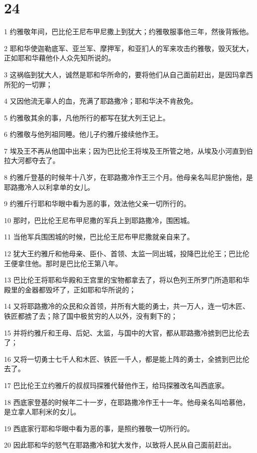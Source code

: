 \chapter{24}

\par 1 约雅敬年间，巴比伦王尼布甲尼撒上到犹大；约雅敬服事他三年，然後背叛他。
\par 2 耶和华使迦勒底军、亚兰军、摩押军，和亚扪人的军来攻击约雅敬，毁灭犹大，正如耶和华藉他仆人众先知所说的。
\par 3 这祸临到犹大人，诚然是耶和华所命的，要将他们从自己面前赶出，是因玛拿西所犯的一切罪；
\par 4 又因他流无辜人的血，充满了耶路撒冷；耶和华决不肯赦免。
\par 5 约雅敬其余的事，凡他所行的都写在犹大列王记上。
\par 6 约雅敬与他列祖同睡。他儿子约雅斤接续他作王。
\par 7 埃及王不再从他国中出来；因为巴比伦王将埃及王所管之地，从埃及小河直到伯拉大河都夺去了。
\par 8 约雅斤登基的时候年十八岁，在耶路撒冷作王三个月。他母亲名叫尼护施他，是耶路撒冷人以利拿单的女儿。
\par 9 约雅斤行耶和华眼中看为恶的事，效法他父亲一切所行的。
\par 10 那时，巴比伦王尼布甲尼撒的军兵上到耶路撒冷，围困城。
\par 11 当他军兵围困城的时候，巴比伦王尼布甲尼撒就亲自来了。
\par 12 犹大王约雅斤和他母亲、臣仆、首领、太监一同出城，投降巴比伦王；巴比伦王便拿住他。那时是巴比伦王第八年。
\par 13 巴比伦王将耶和华殿和王宫里的宝物都拿去了，将以色列王所罗门所造耶和华殿里的金器都毁坏了，正如耶和华所说的；
\par 14 又将耶路撒冷的众民和众首领，并所有大能的勇士，共一万人，连一切木匠、铁匠都掳了去；除了国中极贫穷的人以外，没有剩下的；
\par 15 并将约雅斤和王母、后妃、太监，与国中的大官，都从耶路撒冷掳到巴比伦去了；
\par 16 又将一切勇士七千人和木匠、铁匠一千人，都是能上阵的勇士，全掳到巴比伦去了。
\par 17 巴比伦王立约雅斤的叔叔玛探雅代替他作王，给玛探雅改名叫西底家。
\par 18 西底家登基的时候年二十一岁，在耶路撒冷作王十一年。他母亲名叫哈慕他，是立拿人耶利米的女儿。
\par 19 西底家行耶和华眼中看为恶的事，是照约雅敬一切所行的。
\par 20 因此耶和华的怒气在耶路撒冷和犹大发作，以致将人民从自己面前赶出。

